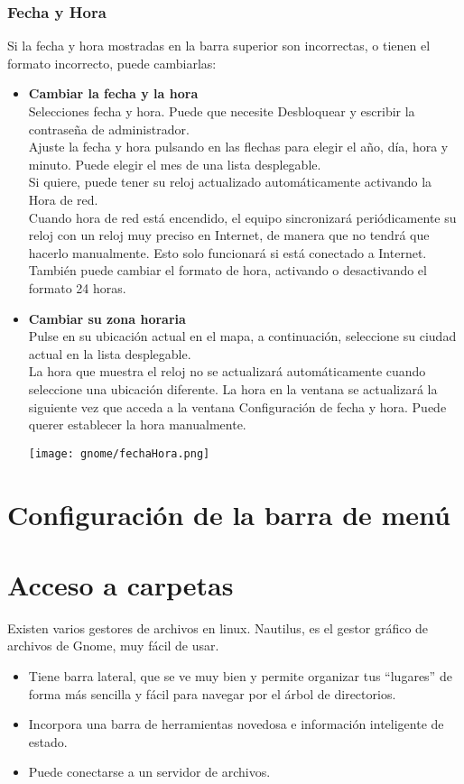 \documentclass[12pt,letterpaper]{book}
\begin{document}
	\subsection{Fecha y Hora}
	Si la fecha y hora mostradas en la barra superior son incorrectas, o tienen el formato incorrecto, puede cambiarlas:\\
\begin{itemize}
\item {\large \bf Cambiar la fecha y la hora}\\
Selecciones fecha y hora.
Puede que necesite Desbloquear y escribir la contraseña de administrador.\\
Ajuste la fecha y hora pulsando en las flechas para elegir el año, día, hora y minuto. Puede elegir el mes de una lista desplegable.\\
Si quiere, puede tener su reloj actualizado automáticamente activando la Hora de red.\\
Cuando hora de red está encendido, el equipo sincronizará periódicamente su reloj con un reloj muy preciso en Internet, de manera que no tendrá que hacerlo manualmente. Esto solo funcionará si está conectado a Internet.\\
También puede cambiar el formato de hora, activando o desactivando el formato 24 horas.
\item {\large \bf Cambiar su zona horaria}\\
Pulse en su ubicación actual en el mapa, a continuación, seleccione su ciudad actual en la lista desplegable.\\
La hora que muestra el reloj no se actualizará automáticamente cuando seleccione una ubicación diferente. La hora en la ventana se actualizará la siguiente vez que acceda a la ventana Configuración de fecha y hora. Puede querer establecer la hora manualmente.
		\begin{center}
			\texttt{[image: gnome/fechaHora.png]} 
		\end{center}
\end{itemize}
\chapter{Configuración de la barra de menú}
\chapter{Acceso a carpetas}
Existen varios gestores de archivos en linux.
Nautilus, es el gestor gráfico de archivos de Gnome, muy fácil de usar.
\begin{itemize}
\item Tiene barra lateral, que se ve muy bien y permite organizar tus “lugares” de forma más sencilla y fácil para navegar por el árbol de directorios.
\item Incorpora una barra de herramientas novedosa e información inteligente de estado.
\item Puede conectarse a un servidor de archivos.
\end{itemize}
\end{document}
